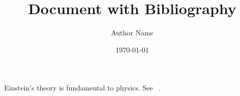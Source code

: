\documentclass{article}
\title{Document with Bibliography}
\author{Author Name}
\date{\today}
\begin{document}
\maketitle

Einstein's theory is fundamental to physics. See ~\cite{einstein}.



\end{document}

